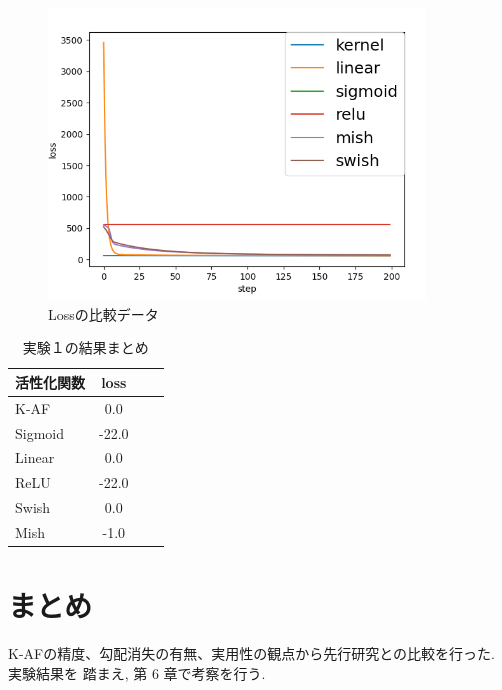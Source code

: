 \begin{figure}[hbtp]
    \begin{center}
        \includegraphics[width=10cm]{asset/boston_0000001_SGDkaiming_normal__non_200.png}
            \caption{Lossの比較データ}
            \label{boston}
    \end{center}
\end{figure}



\begin{table}[htbp]
    \begin{center}
        \caption{実験１の結果まとめ}
        \vspace{5mm} 
        \begin{tabular}{l*{2}{c}r}
            活性化関数              & loss \\
            \hline
            K-AF            & 0.0 \\
            Sigmoid            & -22.0 \\
            Linear            & 0.0 \\
            ReLU        & -22.0 \\
            Swish           & 0.0 \\
            Mish           & -1.0 \\
    
        \end{tabular}
    \end{center}
\end{table}




\section{まとめ}

K-AFの精度、勾配消失の有無、実用性の観点から先行研究との比較を行った. 実験結果を
踏まえ, 第 6 章で考察を行う.


